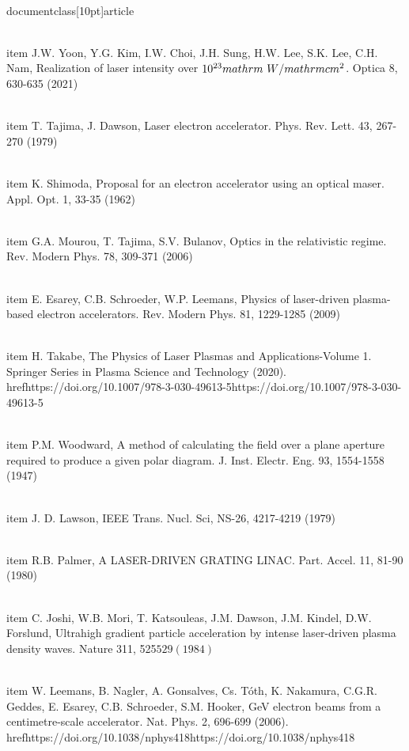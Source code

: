 \\documentclass[10pt]{article}
\begin{document}
{{{{{{  \\item J.W. Yoon, Y.G. Kim, I.W. Choi, J.H. Sung, H.W. Lee, S.K. Lee, C.H. Nam, Realization of laser intensity over $10^{23} \\mathrm{~W} / \\mathrm{cm}^{2}$. Optica 8, 630-635 (2021)

  \\item T. Tajima, J. Dawson, Laser electron accelerator. Phys. Rev. Lett. 43, 267-270 (1979)

  \\item K. Shimoda, Proposal for an electron accelerator using an optical maser. Appl. Opt. 1, 33-35 (1962)

  \\item G.A. Mourou, T. Tajima, S.V. Bulanov, Optics in the relativistic regime. Rev. Modern Phys. 78, 309-371 (2006)

  \\item E. Esarey, C.B. Schroeder, W.P. Leemans, Physics of laser-driven plasma-based electron accelerators. Rev. Modern Phys. 81, 1229-1285 (2009)

  \\item H. Takabe, The Physics of Laser Plasmas and Applications-Volume 1. Springer Series in Plasma Science and Technology (2020). \\href{https://doi.org/10.1007/978-3-030-49613-5}{https://doi.org/10.1007/978-3-030-49613-5}

  \\item P.M. Woodward, A method of calculating the field over a plane aperture required to produce a given polar diagram. J. Inst. Electr. Eng. 93, 1554-1558 (1947)

  \\item J. D. Lawson, IEEE Trans. Nucl. Sci, NS-26, 4217-4219 (1979)

  \\item R.B. Palmer, A LASER-DRIVEN GRATING LINAC. Part. Accel. 11, 81-90 (1980)

  \\item C. Joshi, W.B. Mori, T. Katsouleas, J.M. Dawson, J.M. Kindel, D.W. Forslund, Ultrahigh gradient particle acceleration by intense laser-driven plasma density waves. Nature 311, 525$529(1984)$

  \\item W. Leemans, B. Nagler, A. Gonsalves, Cs. Tóth, K. Nakamura, C.G.R. Geddes, E. Esarey, C.B. Schroeder, S.M. Hooker, GeV electron beams from a centimetre-scale accelerator. Nat. Phys. 2, 696-699 (2006). \\href{https://doi.org/10.1038/nphys418}{https://doi.org/10.1038/nphys418}

}}}}}}
\end{document}
